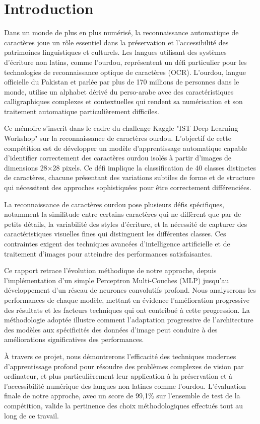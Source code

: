\chapter*{Introduction}
Dans un monde de plus en plus numérisé, la reconnaissance automatique de caractères joue un rôle essentiel dans la préservation et l'accessibilité des patrimoines linguistiques et culturels. Les langues utilisant des systèmes d'écriture non latins, comme l'ourdou, représentent un défi particulier pour les technologies de reconnaissance optique de caractères (OCR). L'ourdou, langue officielle du Pakistan et parlée par plus de 170 millions de personnes dans le monde, utilise un alphabet dérivé du perso-arabe avec des caractéristiques calligraphiques complexes et contextuelles qui rendent sa numérisation et son traitement automatique particulièrement difficiles.

Ce mémoire s'inscrit dans le cadre du challenge Kaggle "IST Deep Learning Workshop" sur la reconnaissance de caractères ourdou. L'objectif de cette compétition est de développer un modèle d'apprentissage automatique capable d'identifier correctement des caractères ourdou isolés à partir d'images de dimensions 28×28 pixels. Ce défi implique la classification de 40 classes distinctes de caractères, chacune présentant des variations subtiles de forme et de structure qui nécessitent des approches sophistiquées pour être correctement différenciées.

La reconnaissance de caractères ourdou pose plusieurs défis spécifiques, notamment la similitude entre certains caractères qui ne diffèrent que par de petits détails, la variabilité des styles d'écriture, et la nécessité de capturer des caractéristiques visuelles fines qui distinguent les différentes classes. Ces contraintes exigent des techniques avancées d'intelligence artificielle et de traitement d'images pour atteindre des performances satisfaisantes.

Ce rapport retrace l'évolution méthodique de notre approche, depuis l'implémentation d'un simple Perceptron Multi-Couches (MLP) jusqu'au développement d'un réseau de neurones convolutifs profond. Nous analyserons les performances de chaque modèle, mettant en évidence l'amélioration progressive des résultats et les facteurs techniques qui ont contribué à cette progression. La méthodologie adoptée illustre comment l'adaptation progressive de l'architecture des modèles aux spécificités des données d'image peut conduire à des améliorations significatives des performances.

À travers ce projet, nous démontrerons l'efficacité des techniques modernes d'apprentissage profond pour résoudre des problèmes complexes de vision par ordinateur, et plus particulièrement leur application à la préservation et à l'accessibilité numérique des langues non latines comme l'ourdou. L'évaluation finale de notre approche, avec un score de 99,1\% sur l'ensemble de test de la compétition, valide la pertinence des choix méthodologiques effectués tout au long de ce travail.